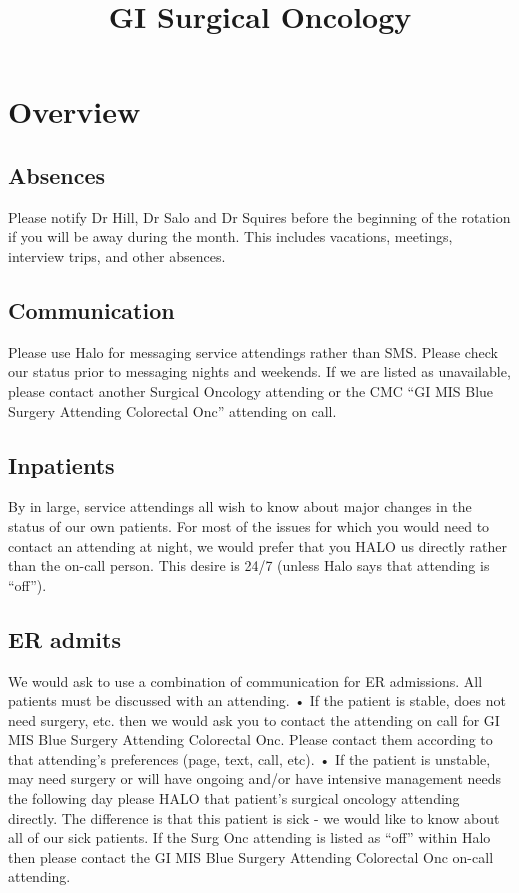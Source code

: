 \documentclass[
]{book}
\title{GI Surgical Oncology}
\author{}
\date{\vspace{-2.5em}}
\begin{document}
\maketitle

{
\setcounter{tocdepth}{0}
\tableofcontents
}
\hypertarget{Intro}{%
\chapter{Overview}\label{Intro}}

\hypertarget{absences}{%
\section{Absences}\label{absences}}

Please notify Dr Hill, Dr Salo and Dr Squires before the beginning of the rotation if you will be away during the month. This includes vacations, meetings, interview trips, and other absences.

\hypertarget{communication}{%
\section{Communication}\label{communication}}

Please use Halo for messaging service attendings rather than SMS. Please check our status prior to messaging nights and weekends. If we are listed as unavailable, please contact another Surgical Oncology attending or the CMC ``GI MIS Blue Surgery Attending Colorectal Onc'' attending on call.

\hypertarget{inpatients}{%
\section{Inpatients}\label{inpatients}}

By in large, service attendings all wish to know about major changes in the status of our own patients. For most of the issues for which you would need to contact an attending at night, we would prefer that you HALO us directly rather than the on-call person. This desire is 24/7 (unless Halo says that attending is ``off'').

\hypertarget{er-admits}{%
\section{ER admits}\label{er-admits}}

We would ask to use a combination of communication for ER admissions. All patients must be discussed with an attending.
• If the patient is stable, does not need surgery, etc. then we would ask you to contact the attending on call for GI MIS Blue Surgery Attending Colorectal Onc. Please contact them according to that attending's preferences (page, text, call, etc).
• If the patient is unstable, may need surgery or will have ongoing and/or have intensive management needs the following day please HALO that patient's surgical oncology attending directly. The difference is that this patient is sick - we would like to know about all of our sick patients. If the Surg Onc attending is listed as ``off'' within Halo then please contact the GI MIS Blue Surgery Attending Colorectal Onc on-call attending.
\end{document}
